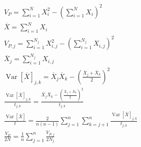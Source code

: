 \documentclass{article}
\DeclareMathOperator{\Var}{\text{Var}}
\newcommand{\Ne}{N}
\newcommand{\VarPhenotype}{V_{P}}
\newcommand{\VarPhenotypej}{V_{P, j}}
\newcommand{\Trait}{X}
\begin{document}
\begin{gather*}
    \VarPhenotype = \sum_{i=1}^{\Ne} \Trait_{i}^2 - \left( \sum_{i=1}^{\Ne} \Trait_{i} \right)^2 \\
    \overline{\Trait} = \sum_{i=1}^{\Ne} \Trait_{i} \\
    \VarPhenotypej = \sum_{i=1}^{\Ne_{j}} \Trait_{i,j}^2 - \left( \sum_{i=1}^{\Ne_{j}} \Trait_{i,j} \right)^2 \\
    \overline{\Trait}_{j} = \sum_{i=1}^{\Ne_{j}} \Trait_{i,j} \\
    \Var \left[ \overline{\Trait}\right]_{j,k} = \overline{\Trait}_{j} \overline{\Trait}_{k} - \left( \frac{\overline{\Trait}_{j} + \overline{\Trait}_{k}}{2} \right)^2  \\
    \frac{\Var \left[ \overline{\Trait}\right]_{j,k}}{t_{j,k}} = \frac{\overline{\Trait}_{j} \overline{\Trait}_{k} - \left( \frac{\overline{\Trait}_{j} + \overline{\Trait}_{k}}{2} \right)^2}{t_{j,k}}  \\
    \frac{\Var \left[ \overline{\Trait}\right]}{t} = \frac{2}{n(n-1)}\sum_{j= 1}^{n} \sum_{k = j + 1}^{n} \frac{\Var \left[ \overline{\Trait }\right]_{j,k}}{t_{j,k}} \\
    \frac{\VarPhenotype}{2 \Ne}  = \frac{1}{n} \sum_{j=1}^{n} \frac{\VarPhenotypej}{2 \Ne _{j}} \\
\end{gather*}

\newpage
\end{document}
